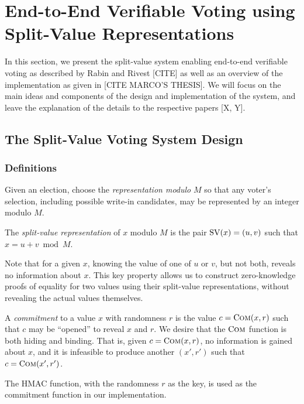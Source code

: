 \chapter{End-to-End Verifiable Voting using Split-Value Representations}

In this section, we present the split-value system enabling end-to-end verifiable voting as described by Rabin and Rivest [CITE] as well as an overview of the implementation as given in [CITE MARCO'S THESIS]. We will focus on the main ideas and components of the design and implementation of the system, and leave the explanation of the details to the respective papers [X, Y].

\section{The Split-Value Voting System Design}

\subsection{Definitions}

Given an election, choose the \emph{representation modulo} $M$ so that any voter's selection, including possible write-in candidates, may be represented by an integer modulo $M$.

\begin{definition}
The \emph{split-value representation} of $x$ modulo $M$ is the pair $\text{SV}(x)=(u,v)$ such that $x = u+v \bmod M$.
\end{definition}

Note that for a given $x$, knowing the value of one of $u$ or $v$, but not both, reveals no information about $x$. This key property allows us to construct zero-knowledge proofs of equality for two values using their split-value representations, without revealing the actual values themselves.

\begin{definition}
A \emph{commitment} to a value $x$ with randomness $r$ is the value $c = \text{C}\textsc{om}(x, r)$ such that $c$ may be ``opened'' to reveal $x$ and $r$. We desire that the $\text{C}\textsc{om}$ function is both hiding and binding. That is, given $c = \text{C}\textsc{om}(x, r)$, no information is gained about $x$, and it is infeasible to produce another $(x', r')$ such that $c = \text{C}\textsc{om}(x', r')$.
\end{definition}

The HMAC function, with the randomness $r$ as the key, is used as the commitment function in our implementation.

